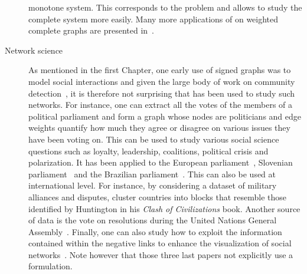 \begin{description}
      monotone system. This corresponds to the \mind{} problem and allows to study
      the complete system more easily. Many more applications of \mind{} on weighted complete graphs
      are presented in~\autocite[Section 6]{clusterEditSurvey13}.

   \item[Network science]
      As mentioned in the first Chapter, one early use of signed graphs was to model social
      interactions and given the large body of work on community
      detection~\autocite{FortunatoSurvey10}, it is therefore not surprising that \pcc{} has been
      used to study such networks. For instance, one can extract all the votes of the members of a
      political parliament and form a graph whose nodes are politicians and edge weights quantify how
      much they agree or disagree on various issues they have been voting on. This can be used to
      study various social science questions such as loyalty, leadership, coalitions, political
      crisis and polarization. It has been applied to the European
      parliament~\autocite{Mendonca2015}, Slovenian parliament~\autocite{Jiang2015} and the
      Brazilian parliament~\autocites{BrazilCC17}. This can also be used at international level. For
      instance, by considering a dataset of military alliances and disputes, \textcite{Traag2009}
      cluster countries into blocks that resemble those identified by Huntington in his \emph{Clash
      of Civilizations} book. Another source of data is the vote on resolutions during the United
      Nations General Assembly~\autocite{CommunityUN12}. Finally, one can also study how to exploit
      the information contained within the negative links to enhance the visualization of social
      networks~\autocite{Luca10}. Note however that those three last papers not explicitly use a
      \pcc{} formulation.


\end{description}
